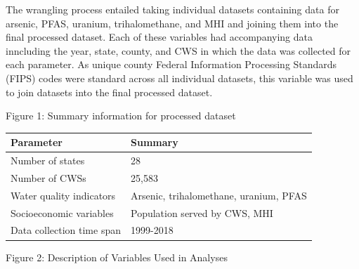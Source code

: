 \documentclass[12pt,]{article}
\begin{document}
The wrangling process entailed taking individual datasets containing
data for arsenic, PFAS, uranium, trihalomethane, and MHI and joining
them into the final processed dataset. Each of these variables had
accompanying data inncluding the year, state, county, and CWS in which
the data was collected for each parameter. As unique county Federal
Information Processing Standards (FIPS) codes were standard across all
individual datasets, this variable was used to join datasets into the
final processed dataset.

Figure 1: Summary information for processed dataset

\begin{longtable}[]{@{}ll@{}}
\toprule
\textbf{Parameter} & \textbf{Summary}\tabularnewline
\midrule
\endhead
Number of states & 28\tabularnewline
Number of CWSs & 25,583\tabularnewline
Water quality indicators & Arsenic, trihalomethane, uranium,
PFAS\tabularnewline
Socioeconomic variables & Population served by CWS, MHI\tabularnewline
Data collection time span & 1999-2018\tabularnewline
\bottomrule
\end{longtable}

Figure 2: Description of Variables Used in Analyses
\end{document}
